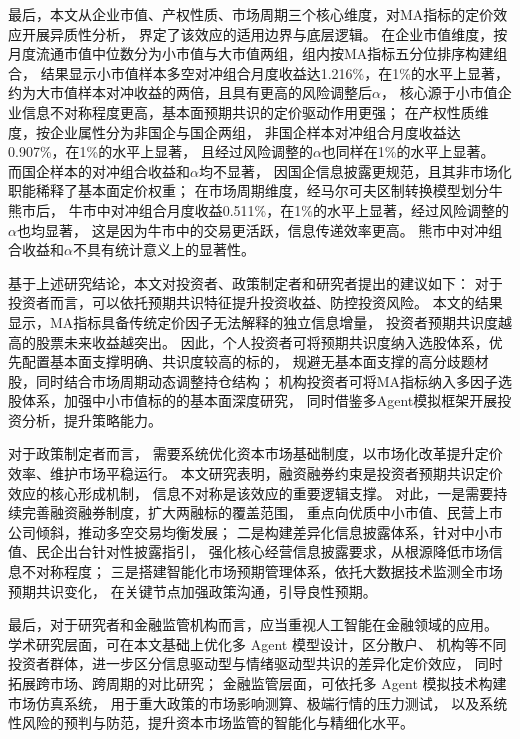 最后，本文从企业市值、产权性质、市场周期三个核心维度，对MA指标的定价效应开展异质性分析，
界定了该效应的适用边界与底层逻辑。
在企业市值维度，按月度流通市值中位数分为小市值与大市值两组，组内按MA指标五分位排序构建组合，
结果显示小市值样本多空对冲组合月度收益达1.216\%，在1\%的水平上显著，
约为大市值样本对冲收益的两倍，且具有更高的风险调整后$\alpha$，
核心源于小市值企业信息不对称程度更高，基本面预期共识的定价驱动作用更强；
在产权性质维度，按企业属性分为非国企与国企两组，
非国企样本对冲组合月度收益达0.907\%，在1\%的水平上显著，
且经过风险调整的$\alpha$也同样在1\%的水平上显著。
而国企样本的对冲组合收益和$\alpha$均不显著，
因国企信息披露更规范，且其非市场化职能稀释了基本面定价权重；
在市场周期维度，经马尔可夫区制转换模型划分牛熊市后，
牛市中对冲组合月度收益0.511\%，在1\%的水平上显著，经过风险调整的$\alpha$也均显著，
这是因为牛市中的交易更活跃，信息传递效率更高。
熊市中对冲组合收益和$\alpha$不具有统计意义上的显著性。

基于上述研究结论，本文对投资者、政策制定者和研究者提出的建议如下：
对于投资者而言，可以依托预期共识特征提升投资收益、防控投资风险。
本文的结果显示，MA指标具备传统定价因子无法解释的独立信息增量，
投资者预期共识度越高的股票未来收益越突出。
因此，个人投资者可将预期共识度纳入选股体系，优先配置基本面支撑明确、共识度较高的标的，
规避无基本面支撑的高分歧题材股，同时结合市场周期动态调整持仓结构；
机构投资者可将MA指标纳入多因子选股体系，加强中小市值标的的基本面深度研究，
同时借鉴多Agent模拟框架开展投资分析，提升策略能力。

对于政策制定者而言，
需要系统优化资本市场基础制度，以市场化改革提升定价效率、维护市场平稳运行。
本文研究表明，融资融券约束是投资者预期共识定价效应的核心形成机制，
信息不对称是该效应的重要逻辑支撑。
对此，一是需要持续完善融资融券制度，扩大两融标的覆盖范围，
重点向优质中小市值、民营上市公司倾斜，推动多空交易均衡发展；
二是构建差异化信息披露体系，针对中小市值、民企出台针对性披露指引，
强化核心经营信息披露要求，从根源降低市场信息不对称程度；
三是搭建智能化市场预期管理体系，依托大数据技术监测全市场预期共识变化，
在关键节点加强政策沟通，引导良性预期。

最后，对于研究者和金融监管机构而言，应当重视人工智能在金融领域的应用。
学术研究层面，可在本文基础上优化多 Agent 模型设计，区分散户、
机构等不同投资者群体，进一步区分信息驱动型与情绪驱动型共识的差异化定价效应，
同时拓展跨市场、跨周期的对比研究；
金融监管层面，可依托多 Agent 模拟技术构建市场仿真系统，
用于重大政策的市场影响测算、极端行情的压力测试，
以及系统性风险的预判与防范，提升资本市场监管的智能化与精细化水平。